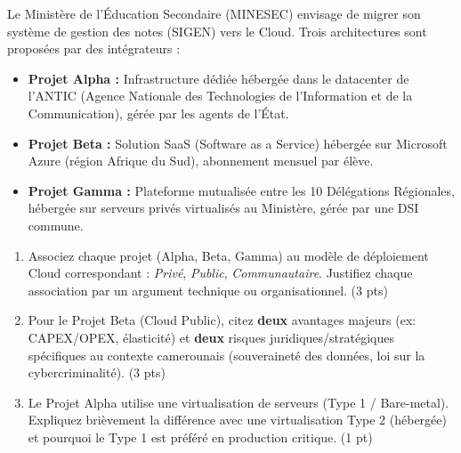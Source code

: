 \documentclass[11pt]{article}
\begin{document}
\begin{exercice}
Le Ministère de l'Éducation Secondaire (MINESEC) envisage de migrer son système de gestion des notes (SIGEN) vers le Cloud. Trois architectures sont proposées par des intégrateurs :
\begin{itemize}
    \item \textbf{Projet Alpha :} Infrastructure dédiée hébergée dans le datacenter de l'ANTIC (Agence Nationale des Technologies de l'Information et de la Communication), gérée par les agents de l'État.
    \item \textbf{Projet Beta :} Solution SaaS (Software as a Service) hébergée sur Microsoft Azure (région Afrique du Sud), abonnement mensuel par élève.
    \item \textbf{Projet Gamma :} Plateforme mutualisée entre les 10 Délégations Régionales, hébergée sur serveurs privés virtualisés au Ministère, gérée par une DSI commune.
\end{itemize}
\begin{enumerate}
    \item Associez chaque projet (Alpha, Beta, Gamma) au modèle de déploiement Cloud correspondant : \textit{Privé}, \textit{Public}, \textit{Communautaire}. Justifiez chaque association par un argument technique ou organisationnel. \hfill (3 pts)
    \item Pour le Projet Beta (Cloud Public), citez \textbf{deux} avantages majeurs (ex: CAPEX/OPEX, élasticité) et \textbf{deux} risques juridiques/stratégiques spécifiques au contexte camerounais (souveraineté des données, loi sur la cybercriminalité). \hfill (3 pts)
    \item Le Projet Alpha utilise une virtualisation de serveurs (Type 1 / Bare-metal). Expliquez brièvement la différence avec une virtualisation Type 2 (hébergée) et pourquoi le Type 1 est préféré en production critique. \hfill (1 pt)
\end{enumerate}
\end{exercice}
\end{document}

